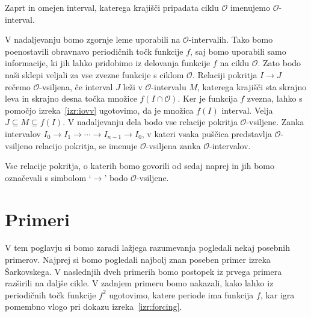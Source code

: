 \documentclass[mat2]{fmfdelo}
\begin{document}
\begin{definicija}
Zaprt in omejen interval, katerega krajišči pripadata ciklu $\mathcal{O}$ imenujemo $\mathcal{O}$-interval. 
\end{definicija}
V nadaljevanju bomo zgornje leme uporabili na $\mathcal{O}$-intervalih. Tako bomo poenostavili obravnavo periodičnih točk funkcije $f$, saj bomo uporabili samo informacije, ki jih lahko pridobimo iz delovanja funkcije $f$ na ciklu $\mathcal{O}$. Zato bodo naši sklepi veljali za vse zvezne funkcije s ciklom $\mathcal{O}$. Relaciji pokritja $I \to J$ rečemo $\mathcal{O}$-vsiljena, če interval $J$ leži v $\mathcal{O}$-intervalu $M$, katerega krajišči sta skrajno leva in skrajno desna točka množice $f(I \cap \mathcal{O})$. Ker je funkcija $f$ zvezna, lahko s pomočjo izreka~\ref{izr:iovv} ugotovimo, da je množica $f(I)$ interval. Velja $J \subseteq M \subseteq f(I)$. V nadaljevanju dela bodo vse relacije pokritja $\mathcal{O}$-vsiljene. Zanka intervalov $I_0 \to I_1 \to \cdots \to I_{n-1} \to I_0$, v kateri vsaka puščica predstavlja $\mathcal{O}$-vsiljeno relacijo pokritja, se imenuje $\mathcal{O}$-vsiljena zanka $\mathcal{O}$-intervalov.


Vse relacije pokritja, o katerih bomo govorili od sedaj naprej in jih bomo označevali s simbolom `$\to$' bodo $\mathcal{O}$-vsiljene.

\section{Primeri}
V tem poglavju si bomo zaradi lažjega razumevanja pogledali nekaj posebnih primerov. Najprej si bomo pogledali najbolj znan poseben primer izreka Šarkovskega. V naslednjih dveh primerih bomo postopek iz prvega primera razširili na daljše cikle. V zadnjem primeru bomo nakazali, kako lahko iz periodičnih točk funkcije $f^2$ ugotovimo, katere periode ima funkcija $f$, kar igra pomembno vlogo pri dokazu izreka~\ref{izr:forcing}.
\end{document}
